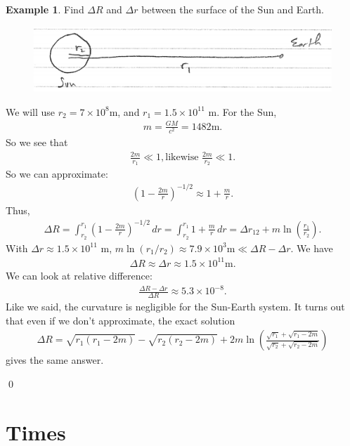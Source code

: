 \documentclass{book}
\theoremstyle{definition}
\newtheorem{exmp}{Example}[section]
\newcommand{\f}[2]{\frac{#1}{#2}}
\newcommand{\lp}{\left(}
\newcommand{\rp}{\right)}
\begin{document}
\begin{exmp}
	Find $\Delta R$ and $\Delta r$ between the surface of the Sun and Earth.
	\begin{figure}[!htb]
		\centering
		\includegraphics[scale=0.4]{sunearth}
	\end{figure}
	We will use $r_2 = 7 \times 10^8$m, and $r_1 = 1.5 \times 10^{11}$ m. For the Sun,
	\begin{align*}
	m = \f{GM}{c^2} = 1482 \text{m}.
	\end{align*}
	So we see that
	\begin{align*}
	\f{2m}{r_1} \ll 1, \text{likewise } \f{2m}{r_2} \ll 1.
	\end{align*}
	So we can approximate:
	\begin{align*}
	\lp 1 - \f{2m}{r}\rp^{-1/2} \approx 1 + \f{m}{r}.
	\end{align*}
	Thus,
	\begin{align*}
	\Delta R = \int^{r_1}_{r_2} \lp 1- \f{2m}{r} \rp^{-1/2}\,dr = \int^{r_1}_{r_2}1 + \f{m}{r}\,dr = \Delta r_{12} + m\ln\lp \f{r_1}{r_2} \rp.
	\end{align*}
	With $\Delta r \approx 1.5\times 10^{11}$ m, $m\ln(r_1/r_2) \approx 7.9\times 10^3 \text{m} \ll \Delta R - \Delta r$. We have
	\begin{align*}
	\Delta R \approx \Delta r \approx 1.5 \times 10^{11} \text{m}.
	\end{align*}
	We can look at relative difference:
	\begin{align*}
	\f{\Delta R - \Delta r}{\Delta R} \approx 5.3 \times 10^{-8}.
	\end{align*}
	Like we said, the curvature is negligible for the Sun-Earth system. It turns out that even if we don't approximate, the exact solution
	\begin{align*}
	\Delta R = \sqrt{r_1(r_1 - 2m)} - \sqrt{r_2(r_2 - 2m)} + 2m\ln\lp \f{\sqrt{r_1} + \sqrt{r_1 - 2m}}{\sqrt{r_2} + \sqrt{r_2 - 2m}} \rp
	\end{align*}
	gives the same answer.
\end{exmp}\qed


\section{Times}
\end{document}
